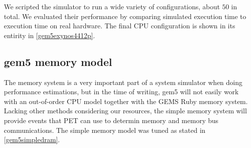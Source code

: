 We scripted the simulator to run a wide variety of configurations, about $50$ in
total. We evaluated their performance by comparing simulated execution time to
execution time on real hardware. The final CPU configuration is shown in its
entirity in \autoref{gem5exynos4412p}.


\subsection{gem5 memory model}
The memory system is a very important part of a system simulator when doing performance estimations, but
in the time of writing, gem5 will not easily work with an out-of-order CPU model together with the GEMS Ruby
memory system. Lacking other methods considering our resources, the simple memory system will provide events
that PET can use to determin memory and memory bus communications. The simple memory model was tuned as stated
in \autoref{gem5simpledram}.
